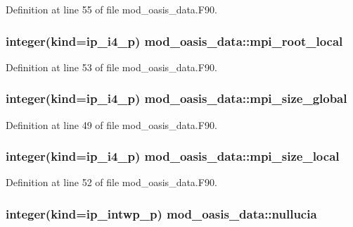 Definition at line 55 of file mod\+\_\+oasis\+\_\+data.\+F90.

\hypertarget{classmod__oasis__data_a2c468f26bc0c9b2ad5d54d68733e7047}{
\subsubsection[{mpi\+\_\+root\+\_\+local}]{\setlength{\rightskip}{0pt plus 5cm}integer(kind=ip\+\_\+i4\+\_\+p) mod\+\_\+oasis\+\_\+data\+::mpi\+\_\+root\+\_\+local}}\label{classmod__oasis__data_a2c468f26bc0c9b2ad5d54d68733e7047}


Definition at line 53 of file mod\+\_\+oasis\+\_\+data.\+F90.

\hypertarget{classmod__oasis__data_a83a9d498c6829e2058675a07446ce5be}{
\subsubsection[{mpi\+\_\+size\+\_\+global}]{\setlength{\rightskip}{0pt plus 5cm}integer(kind=ip\+\_\+i4\+\_\+p) mod\+\_\+oasis\+\_\+data\+::mpi\+\_\+size\+\_\+global}}\label{classmod__oasis__data_a83a9d498c6829e2058675a07446ce5be}


Definition at line 49 of file mod\+\_\+oasis\+\_\+data.\+F90.

\hypertarget{classmod__oasis__data_a617f69fb4d4bb96a94f83a124b4d0030}{
\subsubsection[{mpi\+\_\+size\+\_\+local}]{\setlength{\rightskip}{0pt plus 5cm}integer(kind=ip\+\_\+i4\+\_\+p) mod\+\_\+oasis\+\_\+data\+::mpi\+\_\+size\+\_\+local}}\label{classmod__oasis__data_a617f69fb4d4bb96a94f83a124b4d0030}


Definition at line 52 of file mod\+\_\+oasis\+\_\+data.\+F90.

\hypertarget{classmod__oasis__data_a46d81d5ac9efa619628264c5e45bac41}{
\subsubsection[{nullucia}]{\setlength{\rightskip}{0pt plus 5cm}integer(kind=ip\+\_\+intwp\+\_\+p) mod\+\_\+oasis\+\_\+data\+::nullucia}}\label{classmod__oasis__data_a46d81d5ac9efa619628264c5e45bac41}


